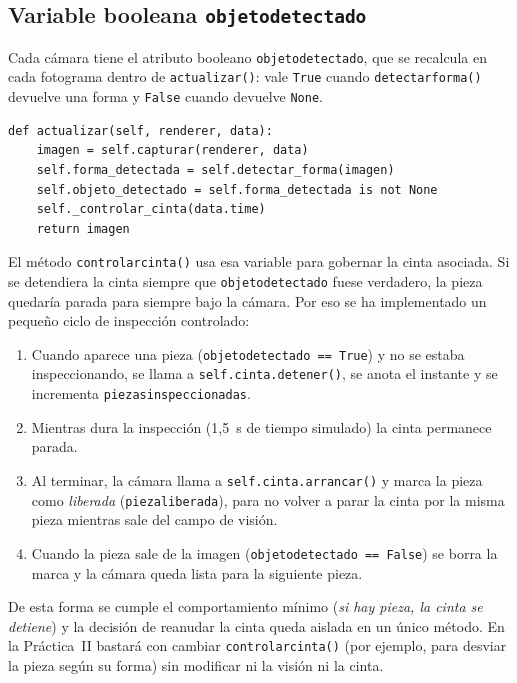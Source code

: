 \documentclass[12pt,a4paper]{article}
\renewcommand{\_}{\guionbajo\allowbreak}
\begin{document}
\subsection{Variable booleana \texttt{objeto\_detectado}}

Cada cámara tiene el atributo booleano \texttt{objeto\_detectado}, que se recalcula en cada
fotograma dentro de \texttt{actualizar()}: vale \texttt{True} cuando
\texttt{detectar\_forma()} devuelve una forma y \texttt{False} cuando devuelve
\texttt{None}.

\begin{lstlisting}[caption={Actualización de la cámara y comunicación con la cinta.}]
def actualizar(self, renderer, data):
    imagen = self.capturar(renderer, data)
    self.forma_detectada = self.detectar_forma(imagen)
    self.objeto_detectado = self.forma_detectada is not None
    self._controlar_cinta(data.time)
    return imagen
\end{lstlisting}
\clearpage
El método \texttt{\_controlar\_cinta()} usa esa variable para gobernar la cinta asociada.
Si se detendiera la cinta siempre que \texttt{objeto\_detectado} fuese verdadero, la pieza
quedaría parada para siempre bajo la cámara. Por eso se ha implementado un pequeño ciclo
de inspección controlado:

\begin{enumerate}
    \item Cuando aparece una pieza (\texttt{objeto\_detectado == True}) y no se estaba
          inspeccionando, se llama a \texttt{self.cinta.detener()}, se anota el instante y
          se incrementa \texttt{piezas\_inspeccionadas}.
    \item Mientras dura la inspección (1,5~s de tiempo simulado) la cinta permanece
          parada.
    \item Al terminar, la cámara llama a \texttt{self.cinta.arrancar()} y marca la pieza
          como \textit{liberada} (\texttt{\_pieza\_liberada}), para no volver a parar la
          cinta por la misma pieza mientras sale del campo de visión.
    \item Cuando la pieza sale de la imagen (\texttt{objeto\_detectado == False}) se borra
          la marca y la cámara queda lista para la siguiente pieza.
\end{enumerate}

De esta forma se cumple el comportamiento mínimo (\textit{si hay pieza, la cinta se
detiene}) y la decisión de reanudar la cinta queda aislada en un único método. En la
Práctica~II bastará con cambiar \texttt{\_controlar\_cinta()} (por ejemplo, para desviar
la pieza según su forma) sin modificar ni la visión ni la cinta.
\end{document}
